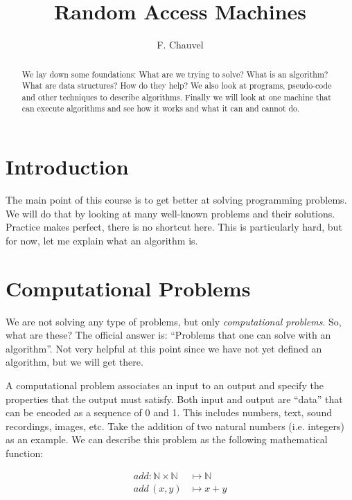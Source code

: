 \documentclass {aldast}
\title{Random Access Machines}
\author{F. Chauvel}
\begin{document}
\maketitle

\begin{abstract}
  We lay down some foundations: What are we trying to solve? What is
  an algorithm? What are data structures? How do they help? We also
  look at programs, pseudo-code and other techniques to describe
  algorithms. Finally we will look at one machine that can execute
  algorithms and see how it works and what it can and cannot do.
\end{abstract}


\section*{Introduction}
The main point of this course is to get better at solving programming
problems. We will do that by looking at many well-known problems and
their solutions. Practice makes perfect, there is no shortcut
here. This is particularly hard, but for now, let me explain what an
algorithm is.

\section{Computational Problems}

We are not solving any type of problems, but only \emph{computational
  problems}. So, what are these?  The official answer is: ``Problems
that one can solve with an algorithm''. Not very helpful at this point
since we have not yet defined an algorithm, but we will get there.

A computational problem associates an input to an output and specify
the properties that the output must satisfy. Both input and output are
``data'' that can be encoded as a sequence of 0 and 1. This includes
numbers, text, sound recordings, images, etc. Take the addition of two
natural numbers (i.e. integers) as an example. We can describe this
problem as the following mathematical function:

\begin{align}
  add: \mathbb{N} \times \mathbb{N} &\mapsto \mathbb{N} \nonumber \\
  add\, (x, y) & \mapsto x + y
\end{align}
\end{document}
